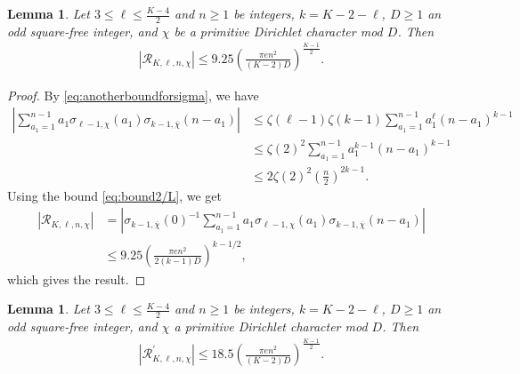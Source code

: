 \documentclass[11pt,letterpaper,reqno]{amsart}
\numberwithin{figure}{section}
\numberwithin{table}{section}
\theoremstyle{definition}
\theoremstyle{plain}
\newtheorem{lemma}[theorem]{Lemma}
\theoremstyle{definition}
\theoremstyle{definition}
\theoremstyle{remark}
\numberwithin{equation}{section}
\theoremstyle{remark}
\begin{document}
\begin{lemma}\label{lem:bdR}
   Let $3\leq\ell\leq\frac{K-4}{2}$ and $n\geq1$  be integers, $k=K-2-\ell$, $D\geq1$ an odd square-free integer, and $\chi$ be a primitive Dirichlet character mod $D$. Then
    \begin{align*}
    |\mathcal{R}_{K,\ell,n,\chi}|\leq9.25\left(\frac{\pi en^2}{(K-2)D}\right)^{\frac{K-1}{2}}.
    \end{align*}
\end{lemma}
\begin{proof}
By \eqref{eq:anotherboundforsigma}, we have
       \begin{align*}
        \left|\sum_{a_1=1}^{n-1}a_1\sigma_{\ell-1,\chi}(a_1)\sigma_{k-1,\overline{\chi}}(n-a_1)\right|&\leq\zeta(\ell-1)\zeta(k-1)\sum_{ a_1=1}^{n-1}a_1^{\ell}(n-a_1)^{k-1}\\&\leq\zeta(2)^2\sum_{ a_1=1}^{ n-1}a_1^{k-1}(n-a_1)^{k-1}\\&\leq2\zeta(2)^2\left(\frac{n}{2}\right)^{2k-1}.
    \end{align*}
Using the bound \eqref{eq:bound2/L}, we get    
\begin{align*}|\mathcal{R}_{K,\ell,n,\chi}|&=\left|\sigma_{k-1,\overline{\chi}}(0)^{-1}\sum_{a_1=1}^{n-1}a_1\sigma_{\ell-1,\chi}(a_1)\sigma_{k-1,\overline{\chi}}(n-a_1)\right|\\&\leq9.25\left(\frac{\pi en^2}{2(k-1)D}\right)^{k-1/2},
\end{align*}
which gives the result.   
\end{proof}
\begin{lemma}\label{lem:bdRprime}
       Let $3\leq\ell\leq\frac{K-4}{2}$ and $n\geq1$ be integers, $k=K-2-\ell$, $D\geq1$ an odd square-free integer, and $\chi$  a primitive Dirichlet character mod $D$. Then
    \begin{align*}
        |\mathcal{R}^{\prime}_{K,\ell,n,\chi}|\leq 18.5\left(\frac{\pi en^2}{(K-2)D}\right)^{\frac{K-1}{2}}.
    \end{align*}
\end{lemma}
\end{document}
